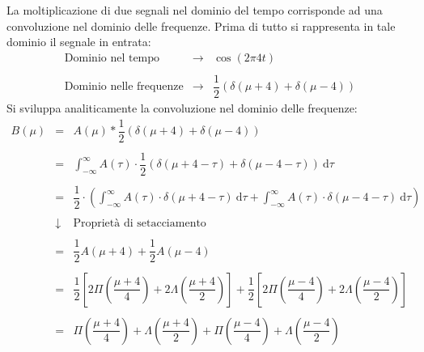 \documentclass[a4paper]{article}
\begin{document}
	La moltiplicazione di due segnali nel dominio del tempo corrisponde ad una convoluzione nel dominio delle frequenze. Prima di tutto si rappresenta in tale dominio il segnale in entrata:
	\begin{equation*}
		\begin{array}{lll}
			\text{Dominio nel tempo} 		& \longrightarrow & \cos\left(2 \pi 4 t\right) \\
			\\
			\text{Dominio nelle frequenze} 	& \longrightarrow &  \dfrac{1}{2}\left(\delta\left(\mu + 4\right) + \delta\left(\mu - 4\right)\right)
		\end{array}
	\end{equation*}
	Si sviluppa analiticamente la convoluzione nel dominio delle frequenze:
	\begin{equation*}
		\begin{array}{lll}
			B\left(\mu\right) & = & A\left(\mu\right) * \dfrac{1}{2}\left(\delta\left(\mu + 4\right) + \delta\left(\mu - 4\right)\right) \\
			\\
			& = & \displaystyle\int_{-\infty}^{\infty} A\left(\tau\right) \cdot \dfrac{1}{2}\left(\delta\left(\mu + 4 - \tau\right) + \delta\left(\mu - 4 - \tau\right)\right) \: \mathrm{d}\tau \\
			\\
			& = & \dfrac{1}{2} \cdot \left(\displaystyle\int_{-\infty}^{\infty} A\left(\tau\right) \cdot \delta\left(\mu + 4 - \tau\right) \: \mathrm{d}\tau + \displaystyle\int_{-\infty}^{\infty} A\left(\tau\right) \cdot \delta\left(\mu - 4 - \tau\right) \: \mathrm{d}\tau\right) \\
			\\
			& \downarrow & \text{Proprietà di setacciamento} \\
			\\
			& = & \dfrac{1}{2} A\left(\mu+4\right) + \dfrac{1}{2} A\left(\mu-4\right) \\
			\\
			& = & \dfrac{1}{2} \left[2\Pi\left(\dfrac{\mu + 4}{4}\right) + 2\Lambda\left(\dfrac{\mu + 4}{2}\right)\right] + \dfrac{1}{2} \left[2\Pi\left(\dfrac{\mu - 4}{4}\right) + 2\Lambda\left(\dfrac{\mu - 4}{2}\right)\right] \\
			\\
			& = & \Pi\left(\dfrac{\mu + 4}{4}\right) + \Lambda\left(\dfrac{\mu + 4}{2}\right) + \Pi\left(\dfrac{\mu - 4}{4}\right) + \Lambda\left(\dfrac{\mu - 4}{2}\right)
		\end{array}
	\end{equation*}
\end{document}
